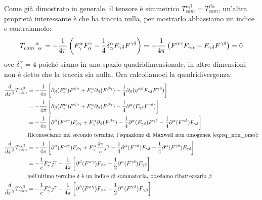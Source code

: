  Come già dimostrato in generale, il tensore è simmetrico $T^{\alpha \beta}_{cam}=T^{\beta \alpha}_{cam}$, un'altra proprietà interessante è che ha traccia nulla, per mostrarlo abbassiamo un indice e contraiamolo:
\begin{equation}
 T\indices{_{cam}^\alpha_\alpha}=-\dfrac{1}{4\pi}\left(F^\alpha_\gamma F^\gamma_\alpha- \dfrac{1}{4}\delta^\alpha_\alpha F_{\gamma\delta} F^{\gamma\delta} \right)=-\dfrac{1}{4\pi}\left(F^{\alpha\gamma} F_{\gamma\alpha}- F_{\gamma\delta} F^{\gamma\delta} \right)=0
\end{equation}
ove $\delta^\alpha_\gamma=4$ poiché siamo in uno spazio quadridimensionale, in altre dimensioni non è detto che la traccia sia nulla. Ora calcoliamoci la quadridivergenza:
\begin{equation}
\begin{aligned}
\dfrac{d}{dx^\beta}T^{\alpha\beta}_{cam}&=-\dfrac{1}{4\pi}\left[\partial_\beta(F^\alpha_\gamma)F^{\beta\gamma}+F^\alpha_\gamma\partial_\beta(F^{\beta\gamma})- \dfrac{1}{4}\partial_\beta(\eta^{\alpha\beta}F_{\gamma\delta} F^{\gamma\delta}) \right]\\
&=-\dfrac{1}{4\pi}\left[\partial_\beta(F^\alpha_\gamma)F^{\beta\gamma}+F^\alpha_\gamma\partial_\beta(F^{\beta\gamma})- \dfrac{1}{4}\partial^\alpha(F_{\gamma\delta} F^{\gamma\delta}) \right]\\
&=-\dfrac{1}{4\pi}\left[\partial^\beta(F^{\alpha\gamma})F_{\beta\gamma}+F^\alpha_\gamma\partial_\beta(F^{\beta\gamma})- \dfrac{1}{4}\partial^\alpha(F_{\gamma\delta}) F^{\gamma\delta}- \dfrac{1}{4}\partial^\alpha(F^{\gamma\delta}) F_{\gamma\delta} \right]\\
&\text{Riconosciamo nel secondo termine, l'equazione di Maxwell non omogenea \eqref{eq:eq_non_omo}:}
\\
\dfrac{d}{dx^\beta}T^{\alpha\beta}_{cam}&=-\dfrac{1}{4\pi}\left[\partial^\beta(F^{\alpha\gamma})F_{\beta\gamma}+F^\alpha_\gamma\dfrac{4\pi}{c}j^\gamma- \dfrac{1}{4}\partial^\alpha(F^{\gamma\delta}) F_{\gamma\delta} - \dfrac{1}{4}\partial^\alpha(F^{\gamma\delta}) F_{\gamma\delta}  \right]\\
&=-\dfrac{1}{c}F^\alpha_\gamma j^\gamma-\dfrac{1}{4\pi}\left[\partial^\beta(F^{\alpha\gamma})F_{\beta\gamma}- \dfrac{1}{2}\partial^\alpha(F^{\gamma\delta}) F_{\gamma\delta}   \right]\\
&\text{nell'ultimo termine $\delta$ è un indice di sommatoria, possiamo ribattezzarlo $\beta$}\\
\dfrac{d}{dx^\beta}T^{\alpha\beta}_{cam}&=-\dfrac{1}{c}F^\alpha_\gamma j^\gamma-\dfrac{1}{4\pi}\left[\partial^\beta(F^{\alpha\gamma})F_{\beta\gamma}- \dfrac{1}{2}\partial^\alpha(F^{\gamma\beta}) F_{\gamma\beta}   \right]
\end{aligned}
\end{equation}
